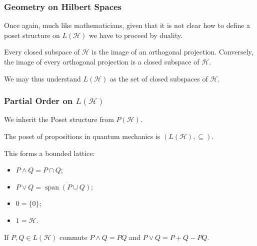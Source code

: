 \documentclass{beamer}
\DeclareMathOperator{\Span}{span}
\begin{document}
\begin{frame}

	\frametitle{Geometry on Hilbert Spaces}
	
	Once again, much like mathematicians, given that it is not clear how to define a poset structure on $L(\mathcal{H})$ we have to proceed by duality.
	
	\begin{theorem}
	
		Every closed subspace of $\mathcal{H}$ is the image of an orthogonal projection. Conversely, the image of every orthogonal projection is a closed subspace of $\mathcal{H}$.	
	
	\end{theorem}
	
	We may thus understand $L(\mathcal{H})$ as the set of closed subspaces of $\mathcal{H}$.

\end{frame}	

\begin{frame}

	\frametitle{Partial Order on $L(\mathcal{H})$}
	
	We inherit the Poset structure from $P(\mathcal{H})$. 
	
	\begin{definition}
	
		The poset of propositions in quantum mechanics is $(L(\mathcal{H}),\subseteq)$.	
	
	\end{definition}

This forms a bounded lattice:

	\begin{itemize}
	
		\item $P\wedge Q=P\cap Q$;
		\item $P\vee Q = \overline{\Span (P\cup Q)}$;
		\item $0=\{0\}$;
		\item $1=\mathcal{H}$.
	
	\end{itemize}
	
	\begin{theorem}
		
		If $P,Q\in L(\mathcal{H})$ commute $P\wedge Q=PQ$ and $P\vee Q=P+Q-PQ$.		
		
	\end{theorem}

\end{frame}
\end{document}
